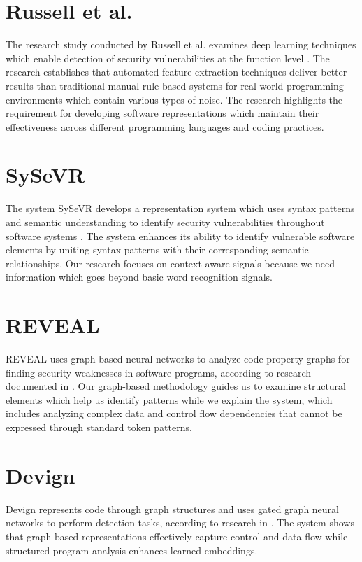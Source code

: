 \section{Russell et al.}
The research study conducted by Russell et al. examines deep learning techniques which enable detection of security vulnerabilities at the function level \cite{russell2018}. The research establishes that automated feature extraction techniques deliver better results than traditional manual rule-based systems for real-world programming environments which contain various types of noise. The research highlights the requirement for developing software representations which maintain their effectiveness across different programming languages and coding practices. 

\section{SySeVR}
The system SySeVR develops a representation system which uses syntax patterns and semantic understanding to identify security vulnerabilities throughout software systems \cite{sysevr}. The system enhances its ability to identify vulnerable software elements by uniting syntax patterns with their corresponding semantic relationships. Our research focuses on context-aware signals because we need information which goes beyond basic word recognition signals.

\section{REVEAL}
REVEAL uses graph-based neural networks to analyze code property graphs for finding security weaknesses in software programs, according to research documented in \cite{reveal}. Our graph-based methodology guides us to examine structural elements which help us identify patterns while we explain the system, which includes analyzing complex data and control flow dependencies that cannot be expressed through standard token patterns.

\section{Devign}
Devign represents code through graph structures and uses gated graph neural networks to perform detection tasks, according to research in \cite{devign}. The system shows that graph-based representations effectively capture control and data flow while structured program analysis enhances learned embeddings.

